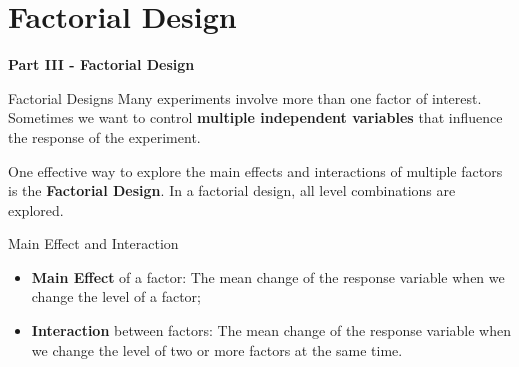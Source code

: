 \section{Factorial Design}
\begin{frame}
  \begin{center}
    {\bf Part III - Factorial Design}
  \end{center}
\end{frame}

\begin{frame}{Factorial Designs}
  Many experiments involve more than one factor of interest. Sometimes we want
  to control {\bf multiple independent variables} that influence the response of the experiment.
  \bigskip

  One effective way to explore the main effects and interactions of multiple factors is
  the {\bf Factorial Design}. In a factorial design, all level combinations are
  explored.\vfill

  \begin{block}{Main Effect and Interaction}
    \begin{itemize}
      \item {\bf Main Effect} of a factor: The mean change of the response variable when we change the level of a factor;
      \bigskip

      \item {\bf Interaction} between factors: The mean change of the response variable when we change the level of two or more factors at the same time.
    \end{itemize}
  \end{block}
\end{frame}

